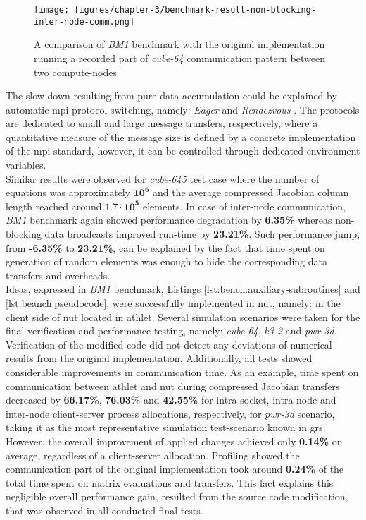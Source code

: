 \begin{figure}[htpb]
  \centering
  \texttt{[image: figures/chapter-3/benchmark-result-non-blocking-inter-node-comm.png]}
  \caption{A comparison of \textit{BM1} benchmark with the original implementation running a recorded part of \textit{cube-64} communication pattern between two compute-nodes}
\label{fig:benchmark:results-cube-64-inter-node-comm}
\end{figure}


The slow-down resulting from pure data accumulation could be explained by automatic \acrshort{mpi} protocol switching, namely: \textit{Eager} and \textit{Rendezvous} \cite{mpi:protocols-explanation}. The protocols are dedicated to small and large message transfers, respectively, where a quantitative measure of the message size is defined by a concrete implementation of the \acrshort{mpi} standard, however, it can be controlled through dedicated environment variables.\\



Similar results were observed for \textit{cube-645} test case where the number of equations was approximately $\bm{10^6}$ and the average compressed Jacobian column length reached around $\bm{1.7 \cdot 10^5}$ elements. In case of  inter-node communication, \textit{BM1} benchmark again showed performance degradation by \textbf{6.35\%} whereas non-blocking data broadcasts improved run-time by \textbf{23.21\%}. Such performance jump, from \textbf{-6.35\%} to \textbf{23.21\%}, can be explained by the fact that time spent on generation of random elements was enough to hide the corresponding data transfers and overheads.\\



Ideas, expressed in \textit{BM1} benchmark, Listings \ref{lst:bench:auxiliary-subroutines} and \ref{lst:beanch:pseudocode}, were successfully implemented in \acrshort{nut}, namely: in the client side of \acrshort{nut} located in \acrshort{athlet}. Several simulation scenarios were taken for the final verification and performance testing, namely: \textit{cube-64}, \textit{k3-2} and \textit{pwr-3d}. Verification of the modified code did not detect any deviations of numerical results from the original implementation. Additionally, all tests showed considerable improvements in communication time. As an example, time spent on communication between \acrshort{athlet} and \acrshort{nut} during compressed Jacobian transfers decreased by \textbf{66.17\%}, \textbf{76.03\%} and \textbf{42.55\%} for intra-socket, intra-node and inter-node client-server process allocations, respectively, for \textit{pwr-3d} scenario, taking it as the most representative simulation test-scenario known in \acrshort{grs}. However, the overall improvement of applied changes achieved only \textbf{0.14\%} on average, regardless of a client-server allocation. Profiling showed the communication part of the original implementation took around \textbf{0.24\%} of the total time spent on matrix evaluations and transfers. This fact explains this negligible overall performance gain, resulted from the source code modification, that was observed in all conducted final tests.\\
